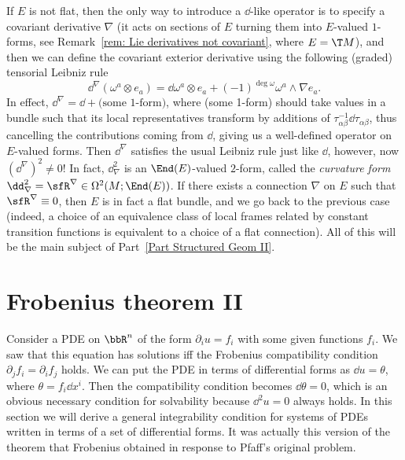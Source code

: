 \begin{rem}
    If $E$ is not flat, then the only way to introduce a $\dd$-like operator is to specify a covariant derivative $\nabla$ (it acts on sections of $E$ turning them into $E$-valued $1$-forms, see Remark~\ref{rem: Lie derivatives not covariant}, where $E=\T M$), and then we can define the covariant exterior derivative using the following (graded) tensorial Leibniz rule
    \[\dd^\nabla(\omega^a\otimes e_a)=\dd\omega^a\otimes e_a+(-1)^{\deg \omega}\omega^a\wedge\nabla e_a.\]
    In effect, $\dd^\nabla=\dd +\text{(some 1-form)}$, where (some 1-form) should take values in a bundle such that its local representatives transform by additions of $\tau_{\alpha\beta}^{-1}\dd\tau_{\alpha\beta}$, thus cancelling the contributions coming from $\dd$, giving us a well-defined operator on $E$-valued forms.
    Then $\dd^\nabla$ satisfies the usual Leibniz rule just like $\dd$, however, now $(\dd^\nabla)^2\neq 0$! In fact, $\dd_\nabla^2$ is an $\End(E)$-valued $2$-form, called the \emph{curvature form} $\dd_\nabla^2=\sfR^\nabla\in\Omega^2(M;\End(E))$. If there exists a connection $\nabla$ on $E$ such that $\sfR^\nabla\equiv 0$, then $E$ is in fact a flat bundle, and we go back to the previous case (indeed, a choice of an equivalence class of local frames related by constant transition functions is equivalent to a choice of a flat connection). All of this will be the main subject of Part~\ref{Part Structured Geom II}.
\end{rem}





\section{Frobenius theorem II}\label{sec: frobenius ii}


Consider a PDE on $\bbR^n$ of the form $\partial_i u=f_i$ with some given functions $f_i$. We saw that this equation has solutions iff the Frobenius compatibility condition $\partial_jf_i=\partial_i f_j$ holds. We can put the PDE in terms of differential forms as $\dd u=\theta$, where $\theta=f_i\dd x^i$. Then the compatibility condition becomes $\dd \theta=0$, which is an obvious necessary condition for solvability because $\dd ^2 u=0$ always holds. In this section we will derive a general integrability condition for systems of PDEs written in terms of a set of differential forms. It was actually this version of the theorem that Frobenius obtained in response to Pfaff's original problem.

